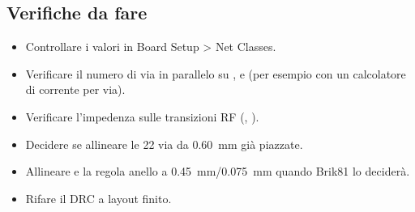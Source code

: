 \subsection{Verifiche da fare}
\begin{itemize}
  \item Controllare i valori in Board Setup > Net Classes.
  \item Verificare il numero di via in parallelo su ,  e  (per esempio con un calcolatore di corrente per via).
  \item Verificare l'impedenza sulle transizioni RF (, ).
  \item Decidere se allineare le 22 via da \SI{0,60}{\milli\metre} già piazzate.
  \item Allineare  e la regola anello a \SI{0,45}{\milli\metre}/\SI{0,075}{\milli\metre} quando Brik81 lo deciderà.
  \item Rifare il DRC a layout finito.
\end{itemize}
